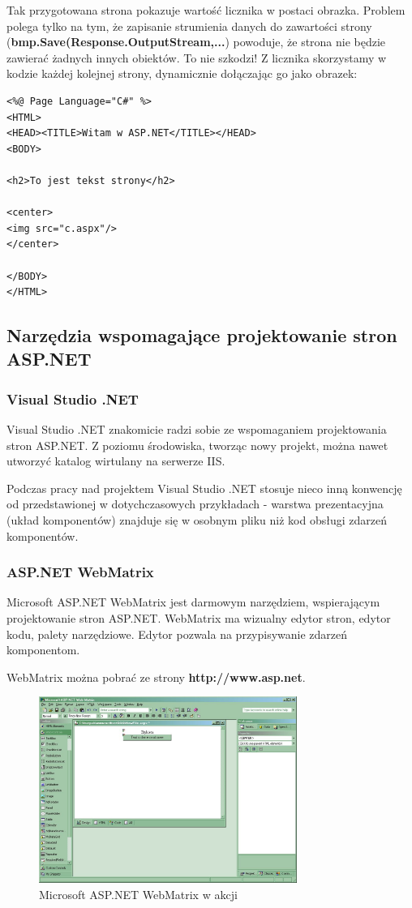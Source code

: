 Tak przygotowana strona pokazuje wartość licznika w postaci obrazka. Problem polega tylko na tym, że
zapisanie strumienia danych do zawartości strony ({\bf bmp.Save(Response.OutputStream,...})
powoduje, że strona nie będzie zawierać żadnych innych obiektów. To nie szkodzi! Z licznika
skorzystamy w kodzie każdej kolejnej strony, dynamicznie dołączając go jako obrazek:

\begin{scriptsize}
\begin{verbatim}
<%@ Page Language="C#" %>
<HTML>
<HEAD><TITLE>Witam w ASP.NET</TITLE></HEAD>
<BODY>

<h2>To jest tekst strony</h2>

<center>
<img src="c.aspx"/>
</center>

</BODY>
</HTML>
\end{verbatim}
\end{scriptsize}

\subsection{Narzędzia wspomagające projektowanie stron ASP.NET}

\subsubsection{Visual Studio .NET}

Visual Studio .NET znakomicie radzi sobie ze wspomaganiem projektowania stron ASP.NET. Z poziomu
środowiska, tworząc nowy projekt, można nawet utworzyć katalog wirtulany na serwerze IIS. 

Podczas pracy nad projektem Visual Studio .NET stosuje nieco inną konwencję od przedstawionej
w dotychczasowych przykładach - warstwa prezentacyjna (układ komponentów) znajduje się w osobnym pliku
niż kod obsługi zdarzeń komponentów. 

\subsubsection{ASP.NET WebMatrix}

Microsoft ASP.NET WebMatrix jest darmowym narzędziem, wspierającym projektowanie stron ASP.NET. 
WebMatrix ma wizualny edytor stron, edytor kodu, palety narzędziowe. Edytor pozwala na przypisywanie zdarzeń
komponentom.

WebMatrix można pobrać ze strony {\bf http://www.asp.net}.

\begin{figure}
\begin{center}
\includegraphics[width=0.75\textwidth]{./pic/asp02}
\caption{Microsoft ASP.NET WebMatrix w akcji}
\end{center}
\end{figure}
